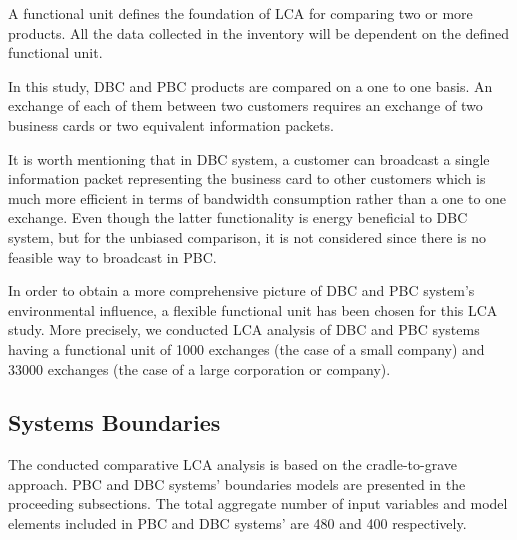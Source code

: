 \documentclass[conference]{IEEEtran}
\begin{document}
A functional unit defines the foundation of LCA for comparing two or more products. All the data collected in the inventory will be dependent on the defined functional unit.

In this study, DBC and PBC products are compared on a one to one basis. An exchange of each of them between two customers requires an exchange of two business cards or two equivalent information packets. 

It is worth mentioning that in DBC system, a customer can broadcast a single information packet representing the business card to other customers which is much more efficient in terms of bandwidth consumption rather than a one to one exchange. Even though the latter functionality is energy beneficial to DBC system, but for the unbiased comparison, it is not considered since there is no feasible way to broadcast in PBC.

In order to obtain a more comprehensive picture of DBC and PBC system's environmental influence, a flexible functional unit has been chosen for this LCA study. More precisely, we conducted LCA analysis of DBC and PBC systems having a functional unit of 1000 exchanges (the case of  a small company) and 33000 exchanges (the case of a large corporation or company).

\subsection{Systems Boundaries} \label{System Boundaries}
The conducted comparative LCA analysis is based on the cradle-to-grave approach. PBC and DBC systems' boundaries models are presented in the proceeding subsections. The total aggregate number of input variables and model elements included in PBC and DBC systems' are 480 and 400 respectively.
\end{document}
